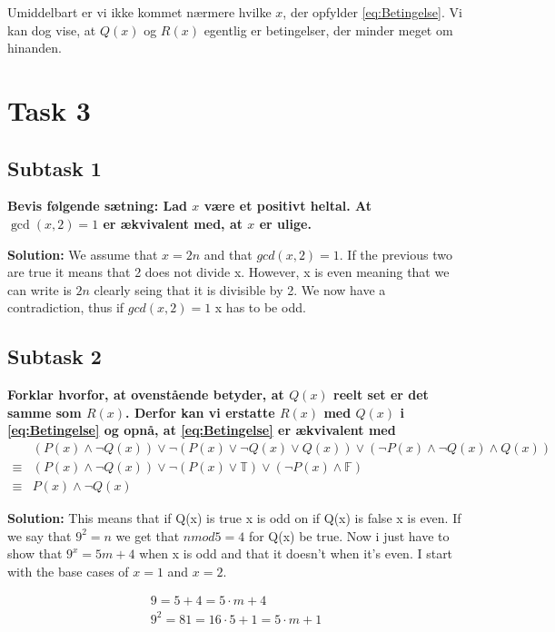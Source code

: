 Umiddelbart er vi ikke kommet nærmere hvilke $x$, der opfylder \eqref{eq:Betingelse}. Vi kan dog vise, at $Q(x)$ og $R(x)$ egentlig er betingelser, der minder meget om hinanden.


\section{Task 3}
\subsection{Subtask 1}
\noindent
\textbf{Bevis følgende sætning: Lad $x$ være et positivt heltal. At $\gcd(x,2)=1$ er ækvivalent med, at $x$ er ulige.}

\bigskip
\noindent
\textbf{Solution:} We assume that $x=2n$ and that $gcd(x,2)=1$. If the previous two are true it means that 2 does not divide x. However, x is even meaning that we can write is $2n$ clearly seing that it is divisible by 2. We now have a contradiction, thus if $gcd(x,2)=1$ x has to be odd.

\subsection{Subtask 2}
\noindent
\textbf{Forklar hvorfor, at ovenstående betyder, at $Q(x)$ reelt set er det samme som $R(x)$. Derfor kan vi erstatte $R(x)$ med $Q(x)$ i \eqref{eq:Betingelse} og opnå, at \eqref{eq:Betingelse} er ækvivalent med
	\begin{align}\label{eq:BetingelseReduceret}
		&(P(x)\wedge \neg Q(x)) \vee \neg(P(x)\vee \neg Q(x) \vee Q(x)) \vee (\neg P(x) \wedge \neg Q(x) \wedge Q(x)) \nonumber\\ 
		\equiv& (P(x)\wedge \neg Q(x)) \vee \neg(P(x)\vee \mathbb{T}) \vee (\neg P(x) \wedge \mathbb{F}) \nonumber\\
		\equiv& P(x)\wedge \neg Q(x)
	\end{align}
}

\bigskip
\noindent
\textbf{Solution:} This means that if Q(x) is true x is odd on if Q(x) is false x is even. If we say that $9^2=n$ we get that $n mod 5 = 4$ for Q(x) be true. Now i just have to show that $9^x = 5m+4$ when x is odd and that it doesn't when it's even. I start with the base cases of $x=1$ and $x=2$.

\begin{equation}
    \begin{aligned}
        9=5+4=5 \cdot m+4 \\
        9^2=81=16 \cdot 5+1=5 \cdot m+1
    \end{aligned}
\end{equation}

